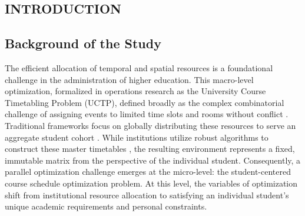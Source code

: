 \documentclass{icsthesis}
\begin{document}
	
	\begin{frontmatter}
		\maketitle
				
		
		\maketableofcontents
		
		\setcounter{pagecounter}{3}
		\makelistoftables

		\setcounter{pagecounter}{4}
		\makelistoffigures

	\end{frontmatter}
	
	\begin{mainmatter}
		
		\section{INTRODUCTION}
		
		\subsection{Background of the Study}
		
		The efficient allocation of temporal and spatial resources is a foundational challenge in the administration of higher education. This macro-level optimization, formalized in operations research as the University Course Timetabling Problem (UCTP), defined broadly as the complex combinatorial challenge of assigning events to limited time slots and rooms without conflict \citep{chen2013, cruzrosales2022}. Traditional frameworks focus on globally distributing these resources to serve an aggregate student cohort \citep{meier2026}. While institutions utilize robust algorithms to construct these master timetables \citep{strichman2017}, the resulting environment represents a fixed, immutable matrix from the perspective of the individual student. Consequently, a parallel optimization challenge emerges at the micro-level: the student-centered course schedule optimization problem. At this level, the variables of optimization shift from institutional resource allocation to satisfying an individual student's unique academic requirements and personal constraints.
		

\end{mainmatter}
\end{document}
